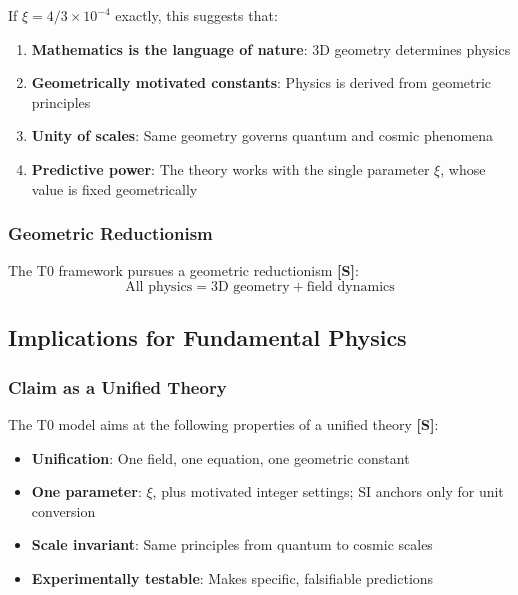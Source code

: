 	If $\xi = 4/3 \times 10^{-4}$ exactly, this suggests that:
	
	\begin{enumerate}
		\item \textbf{Mathematics is the language of nature}: 3D geometry determines physics
		\item \textbf{Geometrically motivated constants}: Physics is derived from geometric principles
		\item \textbf{Unity of scales}: Same geometry governs quantum and cosmic phenomena
		\item \textbf{Predictive power}: The theory works with the single parameter $\xi$, whose value is fixed geometrically
	\end{enumerate}
	
	\subsubsection{Geometric Reductionism}
	\label{subsubsec:geometric_reductionism}
	
	The T0 framework pursues a geometric reductionism \textbf{[S]}:
	\begin{equation}
		\boxed{\text{All physics} = \text{3D geometry} + \text{field dynamics}}
		\label{eq:ultimate_reductionism}
	\end{equation}
	
	\subsection{Implications for Fundamental Physics}
	\label{subsec:fundamental_physics}
	
	\subsubsection{Claim as a Unified Theory}
	\label{subsubsec:toe_candidate}
	
	The T0 model aims at the following properties of a unified theory \textbf{[S]}:
	\begin{itemize}
		\item \textbf{Unification}: One field, one equation, one geometric constant
		\item \textbf{One parameter}: $\xi$, plus motivated integer settings; SI anchors only for unit conversion
		\item \textbf{Scale invariant}: Same principles from quantum to cosmic scales
		\item \textbf{Experimentally testable}: Makes specific, falsifiable predictions
	\end{itemize}
	
